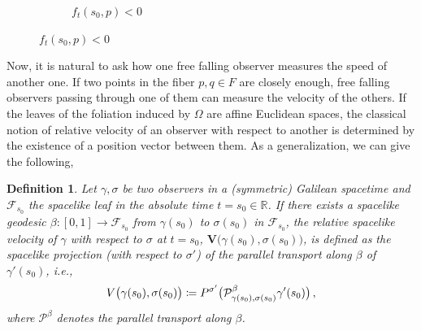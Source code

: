 \documentclass[12pt]{article}
\newcommand{\coloneq}{\vcentcolon\mathrel{\mkern -1.2mu}\mathrel{=}}
\newtheorem{defi}{Definition}[section]
\def\f{\mathcal F}
\begin{document}
\begin{figure}[htbp]
\begin{subfigure}[b]{0.45\textwidth}
        \caption{$f_t(s_0,p)<0$}
        \label{fig:sub2}
    \end{subfigure}
    \label{fig:fig}
\end{figure}

Now, it is natural to ask how one free falling observer measures the speed of another one. If two points in the fiber $p,q\in F$ are closely enough, free falling observers passing through one of them can measure the velocity of the others. If the leaves of the foliation induced by $\Omega$ are affine Euclidean spaces, the classical notion of relative velocity of an observer with respect to another is determined by the existence of a position vector between them. As a generalization, we can give the following, 
\begin{defi}
    Let $\gamma,\sigma$ be two observers in a (symmetric) Galilean spacetime and $\mathcal{F}_{s_{0}}$ the spacelike leaf in the absolute time $t=s_{0}\in\mathbb{R}$. If there exists a spacelike geodesic $\beta\colon [0,1] \to \f_{s_0}$ from $\gamma(s_{0})$ to $\sigma(s_{0})$ in $\f_{s_0}$, the \emph{relative spacelike velocity} of $\gamma$ with respect to $\sigma$ at $t=s_0$, $\textbf{V}\big(\gamma(s_0),\sigma(s_0)\big)$, is defined as the spacelike projection (with respect to $\sigma'$) of the parallel transport along $\beta$ of $\gamma'(s_0)$, i.e., 
    \[
        \textbf{V}\big(\gamma(s_0),\sigma(s_0)\big)\coloneq P^{\sigma'}\big(\mathcal{P}^\beta_{\gamma(s_0),\sigma(s_0)} \gamma'(s_0)\big)\,,
    \]
    where $\mathcal{P}^\beta$ denotes the parallel transport along $\beta$.
\end{defi}
\end{document}
